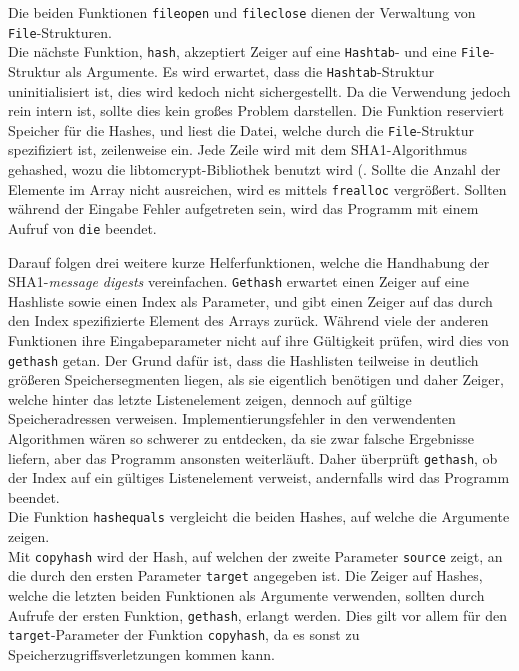 \documentclass[a4paper,titlepage,12pt]{scrartcl}
\begin{document}
Die beiden Funktionen \texttt{fileopen} und \texttt{fileclose} dienen der Verwaltung von \texttt{File}-Strukturen.
\\
Die nächste Funktion, \texttt{hash}, akzeptiert Zeiger auf eine \texttt{Hashtab}- und eine \texttt{File}-Struktur als Argumente.
Es wird erwartet,
dass die \texttt{Hashtab}-Struktur uninitialisiert ist,
dies wird kedoch nicht sichergestellt.
Da die Verwendung jedoch rein intern ist,
sollte dies kein großes Problem darstellen.
Die Funktion reserviert Speicher für die Hashes,
und liest die Datei,
welche durch die \texttt{File}-Struktur spezifiziert ist,
zeilenweise ein.
Jede Zeile wird mit dem SHA1-Algorithmus gehashed,
wozu die libtomcrypt-Bibliothek benutzt wird (\citet{lib:tomcrypt}.
Sollte die Anzahl der Elemente im Array nicht ausreichen,
wird es mittels \texttt{frealloc} vergrößert.
Sollten während der Eingabe Fehler aufgetreten sein,
wird das Programm mit einem Aufruf von \texttt{die} beendet.

Darauf folgen drei weitere kurze Helferfunktionen,
welche die Handhabung der SHA1-\emph{message digests} vereinfachen.
\texttt{Gethash} erwartet einen Zeiger auf eine Hashliste sowie einen Index als Parameter,
und gibt einen Zeiger auf das durch den Index spezifizierte Element des Arrays zurück.
Während viele der anderen Funktionen ihre Eingabeparameter nicht auf ihre Gültigkeit prüfen,
wird dies von \texttt{gethash} getan.
Der Grund dafür ist,
dass die Hashlisten teilweise in deutlich größeren Speichersegmenten liegen,
als sie eigentlich benötigen und daher Zeiger,
welche hinter das letzte Listenelement zeigen,
dennoch auf gültige Speicheradressen verweisen.
Implementierungsfehler in den verwendenten Algorithmen wären so schwerer zu entdecken,
da sie zwar falsche Ergebnisse liefern,
aber das Programm ansonsten weiterläuft.
Daher überprüft \texttt{gethash},
ob der Index auf ein gültiges Listenelement verweist,
andernfalls wird das Programm beendet.
\\
Die Funktion \texttt{hashequals} vergleicht die beiden Hashes,
auf welche die Argumente zeigen.
\\
Mit \texttt{copyhash} wird der Hash,
auf welchen der zweite Parameter \texttt{source} zeigt,
an die durch den ersten Parameter \texttt{target} angegeben ist.
Die Zeiger auf Hashes,
welche die letzten beiden Funktionen als Argumente verwenden,
sollten durch Aufrufe der ersten Funktion, \texttt{gethash},
erlangt werden.
Dies gilt vor allem für den \texttt{target}-Parameter der Funktion \texttt{copyhash},
da es sonst zu Speicherzugriffsverletzungen kommen kann.
\end{document}
